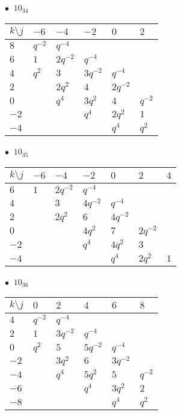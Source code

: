 %
\begin{minipage}{\linewidth}
$\bullet\ $ $10_{34}$ \vspace{0.5em} \\
\begin{tabular}{l|lllll}
$k \setminus j$ & $-6$ & $-4$ & $-2$ & $0$ & $2$ \\
\hline
$8$ & $q^{-2}$ & $q^{-4}$ &  &  &  \\
$6$ & $1$ & $2q^{-2}$ & $q^{-4}$ &  &  \\
$4$ & $q^{2}$ & $3$ & $3q^{-2}$ & $q^{-4}$ &  \\
$2$ &  & $2q^{2}$ & $4$ & $2q^{-2}$ &  \\
$0$ &  & $q^{4}$ & $3q^{2}$ & $4$ & $q^{-2}$ \\
$-2$ &  &  & $q^{4}$ & $2q^{2}$ & $1$ \\
$-4$ &  &  &  & $q^{4}$ & $q^{2}$ \\
\end{tabular}
\vspace{2em}
\end{minipage}
%
\begin{minipage}{\linewidth}
$\bullet\ $ $10_{35}$ \vspace{0.5em} \\
\begin{tabular}{l|llllll}
$k \setminus j$ & $-6$ & $-4$ & $-2$ & $0$ & $2$ & $4$ \\
\hline
$6$ & $1$ & $2q^{-2}$ & $q^{-4}$ &  &  &  \\
$4$ &  & $3$ & $4q^{-2}$ & $q^{-4}$ &  &  \\
$2$ &  & $2q^{2}$ & $6$ & $4q^{-2}$ &  &  \\
$0$ &  &  & $4q^{2}$ & $7$ & $2q^{-2}$ &  \\
$-2$ &  &  & $q^{4}$ & $4q^{2}$ & $3$ &  \\
$-4$ &  &  &  & $q^{4}$ & $2q^{2}$ & $1$ \\
\end{tabular}
\vspace{2em}
\end{minipage}
%
\begin{minipage}{\linewidth}
$\bullet\ $ $10_{36}$ \vspace{0.5em} \\
\begin{tabular}{l|lllll}
$k \setminus j$ & $0$ & $2$ & $4$ & $6$ & $8$ \\
\hline
$4$ & $q^{-2}$ & $q^{-4}$ &  &  &  \\
$2$ & $1$ & $3q^{-2}$ & $q^{-4}$ &  &  \\
$0$ & $q^{2}$ & $5$ & $5q^{-2}$ & $q^{-4}$ &  \\
$-2$ &  & $3q^{2}$ & $6$ & $3q^{-2}$ &  \\
$-4$ &  & $q^{4}$ & $5q^{2}$ & $5$ & $q^{-2}$ \\
$-6$ &  &  & $q^{4}$ & $3q^{2}$ & $2$ \\
$-8$ &  &  &  & $q^{4}$ & $q^{2}$ \\
\end{tabular}
\vspace{2em}
\end{minipage}
